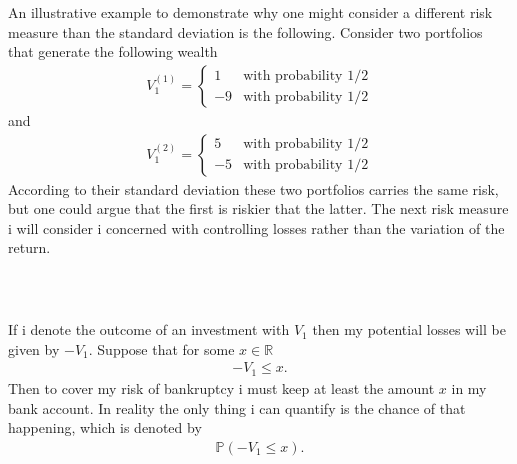 \documentclass{beamer}
\numberwithin{equation}{section}
\begin{document}
\begin{frame}\frametitle{{\normalsize \secname} \\ {\large \subsecname}}
    An illustrative example to demonstrate why one might consider a different risk measure than the standard deviation is the following.
    Consider two portfolios that generate the following wealth
    \begin{align}
        V_1^{(1)} =
        \begin{cases}
            1 &\text{with probability $1/2$} \\
            -9 &\text{with probability $1/2$}
        \end{cases}
    \end{align}
    and
    \begin{align}
        V_1^{(2)} =
        \begin{cases}
            5 &\text{with probability $1/2$} \\
            -5 &\text{with probability $1/2$}
        \end{cases}
    \end{align}
    According to their standard deviation these two portfolios carries the same risk, but one could argue that the first is riskier that the latter.
    The next risk measure i will consider i concerned with controlling losses rather than the variation of the return.
\end{frame}

\begin{frame}\frametitle{{\normalsize \secname} \\ {\large \subsecname}}
    If i denote the outcome of an investment with $V_1$ then my potential losses will be given by $-V_1$.
    Suppose that for some $x \in \mathbb{R}$
    \begin{align}
        -V_1 \leq x.
    \end{align}
    Then to cover my risk of bankruptcy i must keep at least the amount $x$ in my bank account.
    In reality the only thing i can quantify is the chance of that happening, which is denoted by
    \begin{align}
        \mathbb{P}\left( -V_1 \leq x \right).
    \end{align}
\end{frame}
\end{document}
